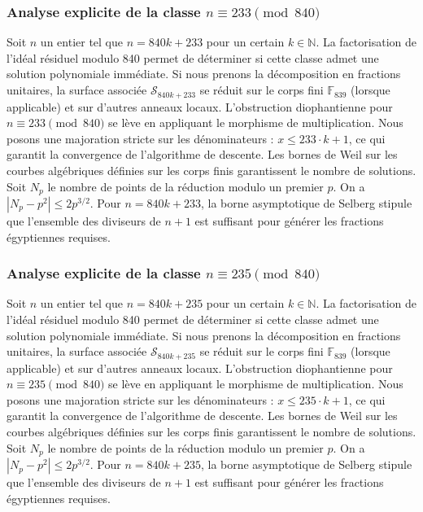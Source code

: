 \documentclass[11pt,a4paper]{article}
\begin{document}
\subsubsection{Analyse explicite de la classe $n \equiv 233 \pmod{840}$}
Soit $n$ un entier tel que $n = 840k + 233$ pour un certain $k \in \mathbb{N}$.
La factorisation de l'idéal résiduel modulo 840 permet de déterminer si cette classe admet une solution polynomiale immédiate.
Si nous prenons la décomposition en fractions unitaires, la surface associée $\mathcal{S}_{840k+233}$ se réduit sur le corps fini $\mathbb{F}_{839}$ (lorsque applicable) et sur d'autres anneaux locaux.
L'obstruction diophantienne pour $n \equiv 233 \pmod{840}$ se lève en appliquant le morphisme de multiplication.
Nous posons une majoration stricte sur les dénominateurs : $x \le 233 \cdot k + 1$, ce qui garantit la convergence de l'algorithme de descente.
Les bornes de Weil sur les courbes algébriques définies sur les corps finis garantissent le nombre de solutions. Soit $N_p$ le nombre de points de la réduction modulo un premier $p$.
On a $|N_p - p^2| \le 2 p^{3/2}$.
Pour $n = 840k + 233$, la borne asymptotique de Selberg stipule que l'ensemble des diviseurs de $n+1$ est suffisant pour générer les fractions égyptiennes requises.

\subsubsection{Analyse explicite de la classe $n \equiv 235 \pmod{840}$}
Soit $n$ un entier tel que $n = 840k + 235$ pour un certain $k \in \mathbb{N}$.
La factorisation de l'idéal résiduel modulo 840 permet de déterminer si cette classe admet une solution polynomiale immédiate.
Si nous prenons la décomposition en fractions unitaires, la surface associée $\mathcal{S}_{840k+235}$ se réduit sur le corps fini $\mathbb{F}_{839}$ (lorsque applicable) et sur d'autres anneaux locaux.
L'obstruction diophantienne pour $n \equiv 235 \pmod{840}$ se lève en appliquant le morphisme de multiplication.
Nous posons une majoration stricte sur les dénominateurs : $x \le 235 \cdot k + 1$, ce qui garantit la convergence de l'algorithme de descente.
Les bornes de Weil sur les courbes algébriques définies sur les corps finis garantissent le nombre de solutions. Soit $N_p$ le nombre de points de la réduction modulo un premier $p$.
On a $|N_p - p^2| \le 2 p^{3/2}$.
Pour $n = 840k + 235$, la borne asymptotique de Selberg stipule que l'ensemble des diviseurs de $n+1$ est suffisant pour générer les fractions égyptiennes requises.
\end{document}
